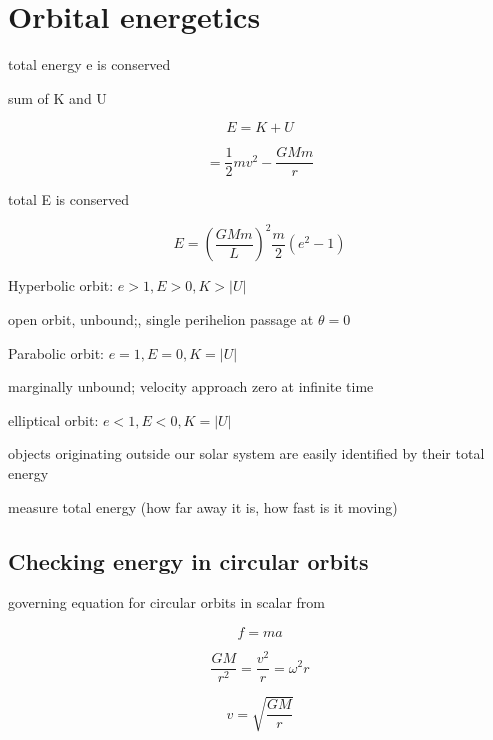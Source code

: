 \documentclass{article}
\begin{document}
\section{Orbital energetics}
\begin{list}{-}{}
\item total energy e is conserved 
 \begin{list}{-}{}
\item sum of K and U 
\item \[E = K+U\]
\item \[= \frac{1}{2} mv^2 - \frac{GMm}{r}\]
\end{list}
\item total E is conserved 
\item \[E = (\frac{GMm}{L})^2 \frac{m}{2}(e^2-1)\]
\item Hyperbolic orbit: $e >1, E>0, K> |U|$
\begin{list}{-}{}
\item open orbit, unbound;, single perihelion passage at $\theta = 0$
\end{list}
\item Parabolic orbit: $e = 1, E = 0, K=|U|$
\begin{list}{-}{}
\item marginally unbound; velocity approach zero at infinite time
\end{list}
\item elliptical orbit: $e<1, E<0, K = |U|$
\item objects originating outside our solar system are easily identified by their total energy 
\begin{list}{-}{}
\item measure total energy (how far away it is, how fast is it moving) 
\end{list}
\end{list}

\subsection{Checking energy in circular orbits}
\begin{list}{-}{}
\item governing equation for circular orbits in scalar from
\item \[f=ma\]
\item \[\frac{GM}{r^2} = \frac{v^2}{r} = \omega^2r\]
\item \[v = \sqrt{\frac{GM}{r}}\]
\end{list}
\end{document}
